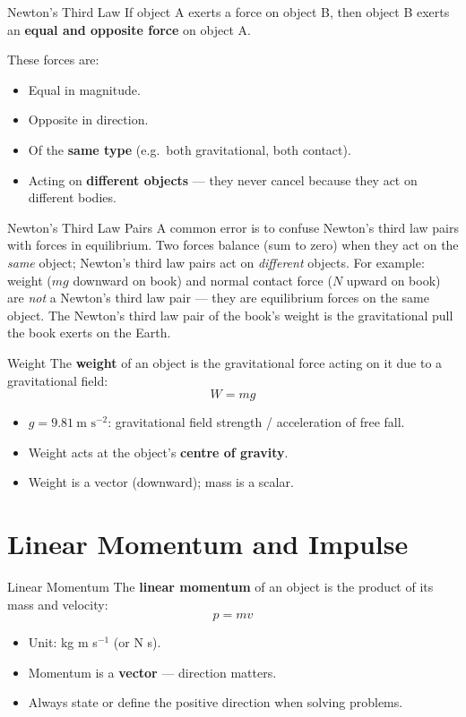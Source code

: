 \begin{definitionbox}{Newton's Third Law}
If object A exerts a force on object B, then object B exerts an \textbf{equal and opposite force} on object A.

These forces are:
\begin{itemize}[itemsep=2pt]
  \item Equal in magnitude.
  \item Opposite in direction.
  \item Of the \textbf{same type} (e.g.\ both gravitational, both contact).
  \item Acting on \textbf{different objects} — they never cancel because they act on different bodies.
\end{itemize}
\end{definitionbox}

\begin{warningbox}{Newton's Third Law Pairs}
A common error is to confuse Newton's third law pairs with forces in equilibrium. Two forces balance (sum to zero) when they act on the \emph{same} object; Newton's third law pairs act on \emph{different} objects. For example: weight ($mg$ downward on book) and normal contact force ($N$ upward on book) are \emph{not} a Newton's third law pair — they are equilibrium forces on the same object. The Newton's third law pair of the book's weight is the gravitational pull the book exerts on the Earth.
\end{warningbox}

\begin{definitionbox}{Weight}
The \textbf{weight} of an object is the gravitational force acting on it due to a gravitational field:
$$W = mg$$
\begin{itemize}[itemsep=2pt]
  \item $g = 9.81\ \text{m s}^{-2}$: gravitational field strength / acceleration of free fall.
  \item Weight acts at the object's \textbf{centre of gravity}.
  \item Weight is a vector (downward); mass is a scalar.
\end{itemize}
\end{definitionbox}

\section{Linear Momentum and Impulse}

\begin{definitionbox}{Linear Momentum}
The \textbf{linear momentum} of an object is the product of its mass and velocity:
$$p = mv$$
\begin{itemize}[itemsep=2pt]
  \item Unit: kg m s$^{-1}$ (or N s).
  \item Momentum is a \textbf{vector} — direction matters.
  \item Always state or define the positive direction when solving problems.
\end{itemize}
\end{definitionbox}

